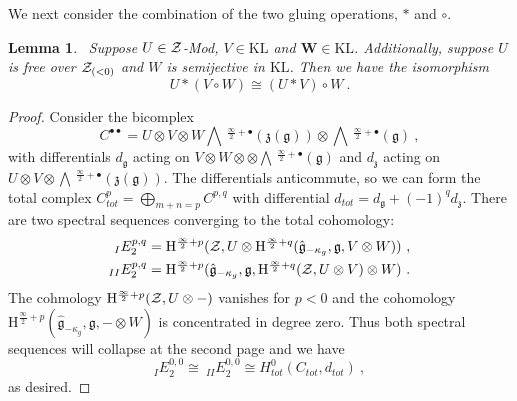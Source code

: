 \documentclass[a4paper]{article}
\newtheorem{lem}[thm]{Lemma}
\def\ZZ{{\cal Z}}
\def\gf{\mathfrak{g}}
\def \zf{\mathfrak{z}}
\def \KL{\mathrm{KL}}
\newcommand{\Hi}[1]{\mathrm{H}^{\frac{\infty}{2}+#1}}
\newcommand{\Li}[1]{\mathrm{\bigwedge}\,^{\frac{\infty}{2}+#1}}
\def\W{\mathbf{W}}
\begin{document}
We next consider the combination of the two gluing operations, $\ast$ and $\circ$.
\begin{lem}~\label{lem:rearr_gauge_ff}
Suppose $U\in\ZZ$-Mod, $V\in\KL$ and $\W\in\KL$. Additionally, suppose $U$ is free over $\ZZ_{(<0)}$ and $W$ is semijective in $\KL$. Then we have the isomorphism
\begin{equation*}
	U\ast(V\circ W) \cong (U\ast V)\circ W~.
\end{equation*}
\end{lem}
\begin{proof}
Consider the bicomplex
\begin{equation*}
	C^{\bullet\bullet} = U\otimes V\otimes W \Li{\bullet} (\zf(\gf))\otimes \Li{\bullet} (\gf)~,
\end{equation*}
with differentials $d_\gf$ acting on $V\otimes W\otimes \otimes \Li{\bullet}(\gf)$ and $d_\zf$ acting on $U\otimes V \otimes \Li{\bullet}(\zf(\gf))$. The differentials anticommute, so we can form the total complex $C^p_{tot} = \bigoplus_{m+n=p} C^{p,q}$ with differential $d_{tot} = d_{\gf}+(-1)^q d_\zf$. There are two spectral sequences converging to the total cohomology:
\begin{equation}
	\begin{split}
	_{I} E_{2}^{p,q} = \Hi{p}(\ZZ, U \otimes \Hi{q}(\hat{\gf}_{-\kappa_g},\gf, V\otimes W))~,\\
	_{II} E_2^{p,q} = \Hi{p}(\hat{\gf}_{-\kappa_g},\gf,\Hi{q}(\ZZ,U \otimes V)\otimes W)~.
	\end{split}
\end{equation}
The cohmology $\Hi{p}(\ZZ,U\otimes - )$ vanishes for $p<0$ and the cohomology $\Hi{p}(\hat{\gf}_{-\kappa_g},\gf, - \otimes W)$ is concentrated in degree zero. Thus both spectral sequences will collapse at the second page and we have
\begin{equation}
	_{I} E_2^{0,0} \cong\ _{II} E_2^{0,0} \cong H^0_{tot}(C_{tot},d_{tot})~,
\end{equation}
as desired.
\end{proof}
\vspace{-6pt}
\end{document}
